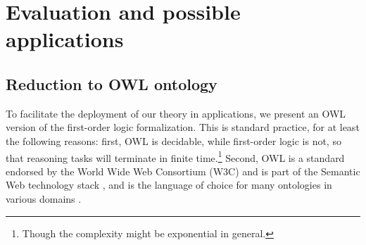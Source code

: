 \documentclass[sw]{iosart2x}
\newcommand{\bflist}{\begin{list}{}{\setlength{\topsep}{2mm}\setlength{\partopsep}{0mm}\setlength{\parsep}{0mm}\setlength{\leftmargin}{9mm}\setlength{\labelwidth}{8mm}}}
\newcommand{\eflist}{\end{list}}
\newcommand{\DefLabel}{\textrm{d}}
\newcounter{cntdef}
\newcommand{\mydf}[1]{\refstepcounter{cntdef}\begin{small}{\bf \DefLabel\thecntdef\label{def:#1}}\end{small}}
\newcommand{\generalStyle}[1]{\texttt{#1}}
\newcommand{\uniRel}[2]{\generalStyle{#1}(#2)}
\newcommand{\triRel}[4]{\generalStyle{#1}(#2,#3,#4)}
\newcommand{\myfi}{\hspace{0.9mm} \Longrightarrow}
\newcommand{\DOLCE}{\textsc{DOLCE}\xspace} %
\newcommand{\OWL}{\textnormal{OWL}\xspace}
\newcommand{\DOLCEProcess}[1]{\uniRel{PRO}{#1}}
\newcommand{\BehaviourConcrete}[1]{\uniRel{Behaviour}{#1}}
\newcommand{\participateAsDoer}[3]{\triRel{participatesAsDoer}{#1}{#2}{#3}}
\newcommand{\quotes}[1]{`#1'}
\newcommand{\TODO}[1]{{%
}}
\newcommand{\TODOinline}[1]{{%
}}
\newcommand{\myComment}[1]{{\unskip \ignorespaces}}
\begin{document}









\section{Evaluation and possible applications}\label{sec:appendice}
\subsection[meta]{Reduction to \OWL ontology}
To facilitate the deployment of our theory in applications, we present an \OWL version of the first-order logic formalization. 
This is standard practice, for at least the following reasons: first, \OWL is decidable, while first-order logic is not, so that reasoning tasks will terminate in finite time.\footnote{Though the complexity might be  exponential in general.\myComment{\TODO{citazione}}} Second, \OWL is a standard endorsed by the World Wide Web Consortium (W3C) and is part of the Semantic Web technology stack \cite{OWL2-QUICK-REFERENCE}, and is the language of choice for many ontologies in various domains \cite{OWL-ontology-repositories}.
\end{document}
